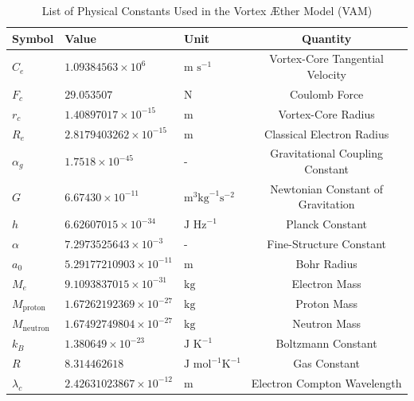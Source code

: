 \documentclass[a4paper,10pt]{article}
\begin{document}
    \begin{table}[h]
        \centering
        \renewcommand{\arraystretch}{1.2}
        \begin{tabular}{lllc}
            \toprule
            \textbf{Symbol} & \textbf{Value} & \textbf{Unit} & \textbf{Quantity} \\
            \midrule
            $C_e$ & $1.09384563 \times 10^6$ & $\text{m s}^{-1}$ & Vortex-Core Tangential Velocity \\
            $F_c$ & $29.053507$ & $\text{N}$ & Coulomb Force \\
            $r_c$ & $1.40897017 \times 10^{-15}$ & $\text{m}$ & Vortex-Core Radius \\
            $R_e$ & $2.8179403262 \times 10^{-15}$ & $\text{m}$ & Classical Electron Radius \\
            $\alpha_g$ & $1.7518 \times 10^{-45}$ & - & Gravitational Coupling Constant \\
            $G$ & $6.67430 \times 10^{-11}$ & $\text{m}^3 \text{kg}^{-1} \text{s}^{-2}$ & Newtonian Constant of Gravitation \\
            $h$ & $6.62607015 \times 10^{-34}$ & $\text{J Hz}^{-1}$ & Planck Constant \\
            $\alpha$ & $7.2973525643 \times 10^{-3}$ & - & Fine-Structure Constant \\
            $a_0$ & $5.29177210903 \times 10^{-11}$ & $\text{m}$ & Bohr Radius \\
            $M_e$ & $9.1093837015 \times 10^{-31}$ & $\text{kg}$ & Electron Mass \\
            $M_{\text{proton}}$ & $1.67262192369 \times 10^{-27}$ & $\text{kg}$ & Proton Mass \\
            $M_{\text{neutron}}$ & $1.67492749804 \times 10^{-27}$ & $\text{kg}$ & Neutron Mass \\
            $k_B$ & $1.380649 \times 10^{-23}$ & $\text{J K}^{-1}$ & Boltzmann Constant \\
            $R$ & $8.314462618$ & $\text{J mol}^{-1} \text{K}^{-1}$ & Gas Constant \\
            $\lambda_c$ & $2.42631023867 \times 10^{-12}$ & $\text{m}$ & Electron Compton Wavelength \\
            \bottomrule
        \end{tabular}
        \caption{List of Physical Constants Used in the Vortex \AE ther Model (VAM)}
        \label{tab:vam_constants}
    \end{table}
\end{document}

